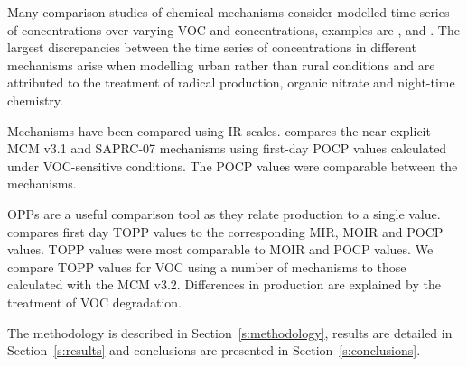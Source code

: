 Many comparison studies of chemical mechanisms consider modelled time series of  concentrations over varying VOC and  concentrations, examples are \citet{Dunker:1984}, \citet{Kuhn:1998} and \citet{Emmerson:2009}.
The largest discrepancies between the time series of  concentrations in different mechanisms arise when modelling urban rather than rural conditions and are attributed to the treatment of radical production, organic nitrate and night-time chemistry.

Mechanisms have been compared using IR scales.
\citet{Derwent:2010} compares the near-explicit MCM v3.1 and SAPRC-07 mechanisms using first-day POCP values calculated under VOC-sensitive conditions. 
The POCP values were comparable between the mechanisms. 

OPPs are a useful comparison tool as they relate  production to a single value. 
\citet{Butler:2011} compares first day TOPP values to the corresponding MIR, MOIR and POCP values.
TOPP values were most comparable to MOIR and POCP values.  
We compare TOPP values for VOC using a number of mechanisms to those calculated with the MCM v3.2. 
Differences in  production are explained by the treatment of VOC degradation.

The methodology is described in \mbox{Section \ref{s:methodology}}, results are detailed in \mbox{Section \ref{s:results}} and conclusions are presented in \mbox{Section \ref{s:conclusions}}.
